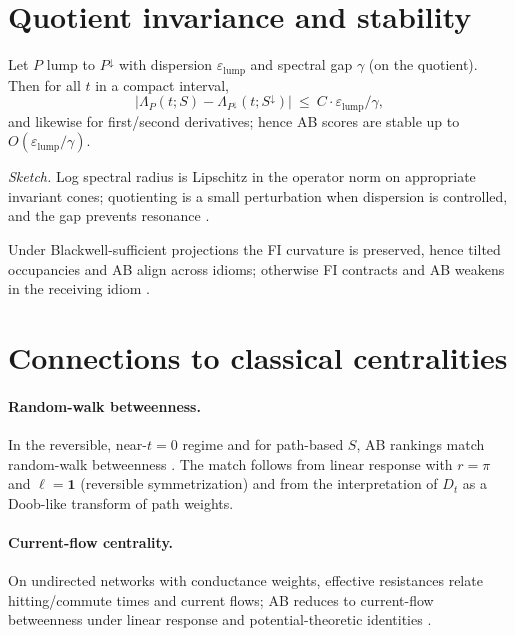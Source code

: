 \documentclass[11pt]{article}
\newcommand{\1}{\mathbbm{1}}
\begin{document}
\section{Quotient invariance and stability}\label{sec:qfi}
\begin{theorem}\label{thm:qfi}
Let $P$ lump to $P^{\downarrow}$ with dispersion $\varepsilon_{\mathrm{lump}}$ and spectral gap $\gamma$ (on the quotient). Then for all $t$ in a compact interval,
\[
\big|\Lambda_P(t;S)-\Lambda_{P^{\downarrow}}(t;S^{\downarrow})\big|\ \le\ C\cdot \varepsilon_{\mathrm{lump}}/\gamma,
\]
and likewise for first/second derivatives; hence AB scores are stable up to $O(\varepsilon_{\mathrm{lump}}/\gamma)$. 
\end{theorem}
\noindent\emph{Sketch.} Log spectral radius is Lipschitz in the operator norm on appropriate invariant cones; quotienting is a small perturbation when dispersion is controlled, and the gap prevents resonance \parencite{Chung1997,DemboZeitouni1998,elliott2025qfi}.

\begin{corollary}
Under Blackwell-sufficient projections the FI curvature is preserved, hence tilted occupancies and AB align across idioms; otherwise FI contracts and AB weakens in the receiving idiom \parencite{Blackwell1953,AmariNagaoka2000,Cencov1982,elliott2025qfi}.
\end{corollary}

\section{Connections to classical centralities}\label{sec:connections}
\paragraph{Random-walk betweenness.}
In the reversible, near-$t=0$ regime and for path-based $S$, AB rankings match random-walk betweenness \parencite{Newman2005}. The match follows from linear response with $r=\pi$ and $\ell=\mathbf{1}$ (reversible symmetrization) and from the interpretation of $D_t$ as a Doob-like transform of path weights.

\paragraph{Current-flow centrality.}
On undirected networks with conductance weights, effective resistances relate hitting/commute times and current flows; AB reduces to current-flow betweenness under linear response and potential-theoretic identities \parencite{DoyleSnell1984,LevinPeresWilmer2009}.
\end{document}
